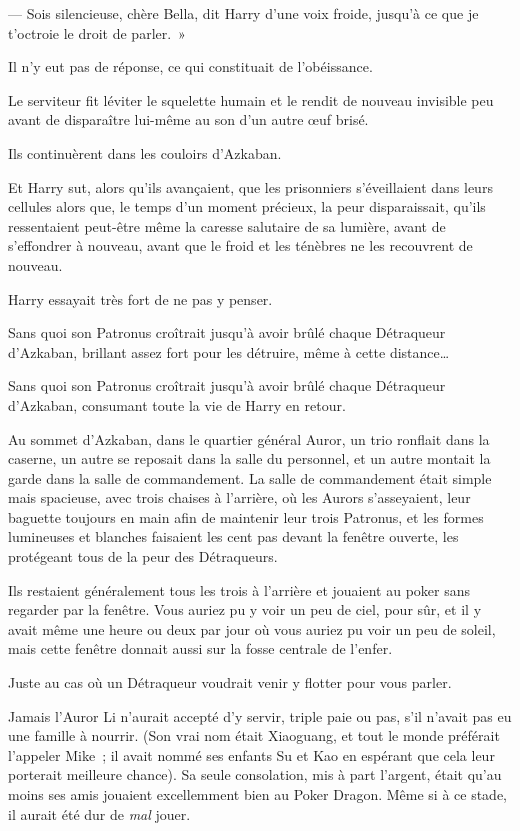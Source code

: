 --- Sois silencieuse, chère Bella, dit Harry d'une voix froide, jusqu'à ce que je t'octroie le droit de parler.~»

Il n'y eut pas de réponse, ce qui constituait de l'obéissance.

Le serviteur fit léviter le squelette humain et le rendit de nouveau invisible peu avant de disparaître lui-même au son d'un autre œuf brisé.

Ils continuèrent dans les couloirs d'Azkaban.

Et Harry sut, alors qu'ils avançaient, que les prisonniers s'éveillaient dans leurs cellules alors que, le temps d'un moment précieux, la peur disparaissait, qu'ils ressentaient peut-être même la caresse salutaire de sa lumière, avant de s'effondrer à nouveau, avant que le froid et les ténèbres ne les recouvrent de nouveau.

Harry essayait très fort de ne pas y penser.

Sans quoi son Patronus croîtrait jusqu'à avoir brûlé chaque Détraqueur d'Azkaban, brillant assez fort pour les détruire, même à cette distance…

Sans quoi son Patronus croîtrait jusqu'à avoir brûlé chaque Détraqueur d'Azkaban, consumant toute la vie de Harry en retour.

\later

Au sommet d'Azkaban, dans le quartier général Auror, un trio ronflait dans la caserne, un autre se reposait dans la salle du personnel, et un autre montait la garde dans la salle de commandement. La salle de commandement était simple mais spacieuse, avec trois chaises à l'arrière, où les Aurors s'asseyaient, leur baguette toujours en main afin de maintenir leur trois Patronus, et les formes lumineuses et blanches faisaient les cent pas devant la fenêtre ouverte, les protégeant tous de la peur des Détraqueurs.

Ils restaient généralement tous les trois à l'arrière et jouaient au poker sans regarder par la fenêtre. Vous auriez pu y voir un peu de ciel, pour sûr, et il y avait même une heure ou deux par jour où vous auriez pu voir un peu de soleil, mais cette fenêtre donnait aussi sur la fosse centrale de l'enfer.

Juste au cas où un Détraqueur voudrait venir y flotter pour vous parler.

Jamais l'Auror Li n'aurait accepté d'y servir, triple paie ou pas, s'il n'avait pas eu une famille à nourrir. (Son vrai nom était Xiaoguang, et tout le monde préférait l'appeler Mike~; il avait nommé ses enfants Su et Kao en espérant que cela leur porterait meilleure chance). Sa seule consolation, mis à part l'argent, était qu'au moins ses amis jouaient excellemment bien au Poker Dragon. Même si à ce stade, il aurait été dur de \emph{mal} jouer.


